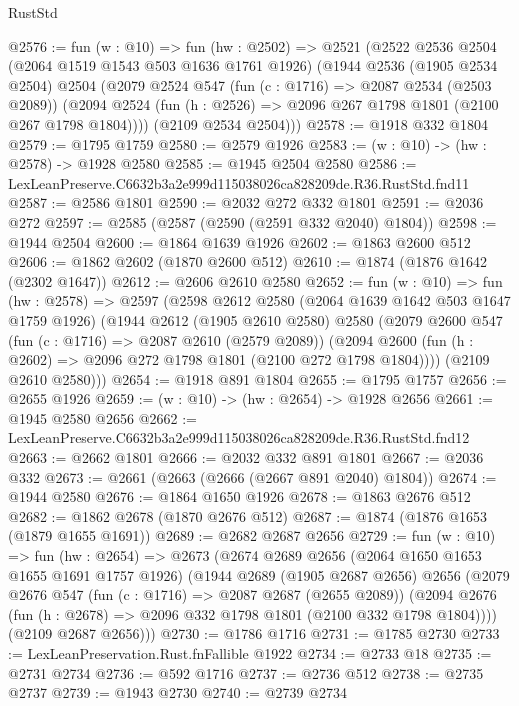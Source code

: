 \begin{lexlean}{RustStd}
\begin{coremodule}
@2576 := fun (w : @10) =>
  fun (hw : @2502) =>
  @2521
    (@2522
      @2536
      @2504
      (@2064 @1519 @1543 @503 @1636 @1761 @1926)
      (@1944
        @2536
        (@1905 @2534 @2504)
        @2504
        (@2079
          @2524
          @547
          (fun (c : @1716) => @2087 @2534 (@2503 @2089))
          (@2094 @2524 (fun (h : @2526) => @2096 @267 @1798 @1801 (@2100 @267 @1798 @1804))))
        (@2109 @2534 @2504)))
@2578 := @1918 @332 @1804
@2579 := @1795 @1759
@2580 := @2579 @1926
@2583 := (w : @10) -> (hw : @2578) -> @1928 @2580
@2585 := @1945 @2504 @2580
@2586 := LexLeanPreserve.C6632b3a2e999d115038026ca828209de.R36.RustStd.fnd11
@2587 := @2586 @1801
@2590 := @2032 @272 @332 @1801
@2591 := @2036 @272
@2597 := @2585 (@2587 (@2590 (@2591 @332 @2040) @1804))
@2598 := @1944 @2504
@2600 := @1864 @1639 @1926
@2602 := @1863 @2600 @512
@2606 := @1862 @2602 (@1870 @2600 @512)
@2610 := @1874 (@1876 @1642 (@2302 @1647))
@2612 := @2606 @2610 @2580
@2652 := fun (w : @10) =>
  fun (hw : @2578) =>
  @2597
    (@2598
      @2612
      @2580
      (@2064 @1639 @1642 @503 @1647 @1759 @1926)
      (@1944
        @2612
        (@1905 @2610 @2580)
        @2580
        (@2079
          @2600
          @547
          (fun (c : @1716) => @2087 @2610 (@2579 @2089))
          (@2094 @2600 (fun (h : @2602) => @2096 @272 @1798 @1801 (@2100 @272 @1798 @1804))))
        (@2109 @2610 @2580)))
@2654 := @1918 @891 @1804
@2655 := @1795 @1757
@2656 := @2655 @1926
@2659 := (w : @10) -> (hw : @2654) -> @1928 @2656
@2661 := @1945 @2580 @2656
@2662 := LexLeanPreserve.C6632b3a2e999d115038026ca828209de.R36.RustStd.fnd12
@2663 := @2662 @1801
@2666 := @2032 @332 @891 @1801
@2667 := @2036 @332
@2673 := @2661 (@2663 (@2666 (@2667 @891 @2040) @1804))
@2674 := @1944 @2580
@2676 := @1864 @1650 @1926
@2678 := @1863 @2676 @512
@2682 := @1862 @2678 (@1870 @2676 @512)
@2687 := @1874 (@1876 @1653 (@1879 @1655 @1691))
@2689 := @2682 @2687 @2656
@2729 := fun (w : @10) =>
  fun (hw : @2654) =>
  @2673
    (@2674
      @2689
      @2656
      (@2064 @1650 @1653 @1655 @1691 @1757 @1926)
      (@1944
        @2689
        (@1905 @2687 @2656)
        @2656
        (@2079
          @2676
          @547
          (fun (c : @1716) => @2087 @2687 (@2655 @2089))
          (@2094 @2676 (fun (h : @2678) => @2096 @332 @1798 @1801 (@2100 @332 @1798 @1804))))
        (@2109 @2687 @2656)))
@2730 := @1786 @1716
@2731 := @1785 @2730
@2733 := LexLeanPreservation.Rust.fnFallible @1922
@2734 := @2733 @18
@2735 := @2731 @2734
@2736 := @592 @1716
@2737 := @2736 @512
@2738 := @2735 @2737
@2739 := @1943 @2730
@2740 := @2739 @2734

\end{coremodule}
\end{lexlean}
